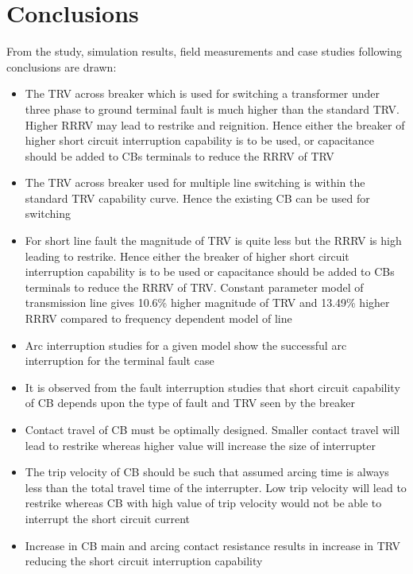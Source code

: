 \section{Conclusions}
From the study, simulation results, field measurements and case studies following conclusions are drawn:
\begin{itemize}
\item The TRV across breaker which is used for switching a transformer under three phase to ground terminal fault is much higher than the standard TRV. Higher RRRV may lead to restrike and reignition. Hence either the breaker of higher short circuit interruption capability is to be used, or capacitance should be added to CBs terminals to reduce the RRRV of TRV

\item The TRV across breaker used for multiple line switching is within the standard TRV capability curve. Hence the existing CB can be used for switching

\item For short line fault the magnitude of TRV is quite less but the RRRV is high leading to restrike. Hence either the breaker of higher short circuit interruption capability is to be used or capacitance should be added to CBs terminals to reduce the RRRV of TRV. Constant parameter model of transmission line gives 10.6\% higher magnitude of TRV and 13.49\% higher RRRV compared to frequency dependent model of line

\item Arc interruption studies for a given model show the successful arc interruption for the terminal fault case

\item It is observed from the fault interruption studies that short circuit capability of CB depends upon the type of fault and TRV seen by the breaker

\item Contact travel of CB must be optimally designed. Smaller contact travel will lead to restrike whereas higher value will increase the size of interrupter

\item The trip velocity of CB should be such that assumed arcing time is always less than the total travel time of the interrupter. Low trip velocity will lead to restrike whereas CB with high value of trip velocity would not be able to interrupt the short circuit current

\item Increase in CB main and arcing contact resistance results in increase in TRV reducing the short circuit interruption capability


\end{itemize}
